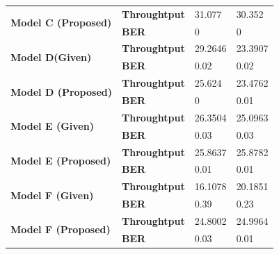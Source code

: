\documentclass[a4paper]{article}
\begin{document}
\begin{table}[h]
\begin{tabular}{|l|l|l|l|}
\multirow{2}{*}{\textbf{Model C (Proposed)}}                    & \textbf{Throughtput}              & 31.077                          & 30.352                          \\ \cline{2-4}
                                                                & \textbf{BER}                      & 0                               & 0                               \\ \hline
\multirow{2}{*}{\textbf{Model D(Given)}}                        & \textbf{Throughtput}              & 29.2646                         & 23.3907                         \\ \cline{2-4}
                                                                & \textbf{BER}                      & 0.02                            & 0.02                            \\ \hline
\multirow{2}{*}{\textbf{Model D (Proposed)}}                    & \textbf{Throughtput}              & 25.624                          & 23.4762                         \\ \cline{2-4}
                                                                & \textbf{BER}                      & 0                               & 0.01                            \\ \hline
\multirow{2}{*}{\textbf{Model E (Given)}}                       & \textbf{Throughtput}              & 26.3504                         & 25.0963                         \\ \cline{2-4}
                                                                & \textbf{BER}                      & 0.03                            & 0.03                            \\ \hline
\multirow{2}{*}{\textbf{Model E (Proposed)}}                    & \textbf{Throughtput}              & 25.8637                         & 25.8782                         \\ \cline{2-4}
                                                                & \textbf{BER}                      & 0.01                            & 0.01                            \\ \hline
\multirow{2}{*}{\textbf{Model F (Given)}}                       & \textbf{Throughtput}              & 16.1078                         & 20.1851                         \\ \cline{2-4}
                                                                & \textbf{BER}                      & 0.39                            & 0.23                            \\ \hline
\multirow{2}{*}{\textbf{Model F (Proposed)}}                    & \textbf{Throughtput}              & 24.8002                         & 24.9964                         \\ \cline{2-4}
                                                                & \textbf{BER}                      & 0.03                            & 0.01                            \\ \hline
\end{tabular}
\end{table}
\end{document}
